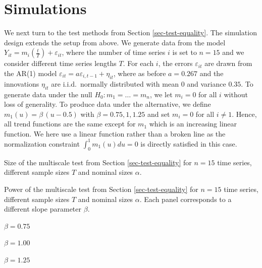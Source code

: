 
\section{Simulations}\label{sec-sim}

We next turn to the test methods from Section \ref{sec-test-equality}. The simulation design extends the setup from above. We generate data from the model $Y_{it} = m_i(\frac{t}{T}) + \varepsilon_{it}$, where the number of time series $i$ is set to $n = 15$ and we consider different time series lengths $T$. For each $i$, the errors $\varepsilon_{it}$ are drawn from the AR(1) model $\varepsilon_{it} = a \varepsilon_{i,t-1} + \eta_{it}$, where as before $a = 0.267$ and the innovations $\eta_{it}$ are i.i.d.\ normally distributed with mean $0$ and variance $0.35$. To generate data under the null $H_0: m_1 = \ldots = m_n$, we let $m_i = 0$ for all $i$ without loss of generality. To produce data under the alternative, we define $m_1(u) = \beta \, (u - 0.5) $ with $\beta = 0.75, 1, 1.25$ and set $m_i = 0$ for all $i \ne 1$. Hence, all trend functions are the same except for $m_1$ which is an increasing linear function. We here use a linear function rather than a broken line as the normalization constraint $\int_0^1 m_1(u) du = 0$ is directly satisfied in this case. 

\addtocounter{table}{-1} 
\begin{table}[t]
\footnotesize{
\begin{center}
\caption{Size of the multiscale test from Section \ref{sec-test-equality} for $n=15$ time series, different sample sizes $T$ and nominal sizes $\alpha$.}
\label{tab:size_equality}
\renewcommand{\arraystretch}{1.2}

\end{center}}
\footnotesize{
\begin{center}
\caption{Power of the multiscale test from Section \ref{sec-test-equality} for $n=15$ time series, different sample sizes $T$ and nominal sizes $\alpha$. Each panel corresponds to a different slope parameter $\beta$.}\label{tab:power_equality}
\begin{subtable}[b]{0.32\textwidth}
\centering
\caption{$\beta = 0.75$}\label{tab:power_75_equality}
\renewcommand{\arraystretch}{1.2}

\end{subtable}
\begin{subtable}[b]{0.32\textwidth}
\centering
\caption{$\beta = 1.00$}\label{tab:power_100_equality}
\renewcommand{\arraystretch}{1.2}

\end{subtable}
\begin{subtable}[b]{0.32\textwidth}
\centering
\caption{$\beta = 1.25$}\label{tab:power_125_equality}
\renewcommand{\arraystretch}{1.2}

\end{subtable}
\end{center}}
\vspace{-0.4cm}
\end{table}

